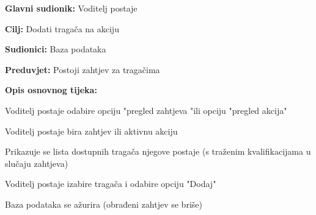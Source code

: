 					\noindent {}
					\begin{packed_item}
	
						\item \textbf{Glavni sudionik: }  Voditelj postaje
						\item  \textbf{Cilj:} Dodati tragača na akciju
						\item  \textbf{Sudionici:} Baza podataka
						\item  \textbf{Preduvjet:}  Postoji zahtjev za tragačima
						\item  \textbf{Opis osnovnog tijeka:} 
						
						
						\item[] \begin{packed_enum}
	
							\item Voditelj postaje odabire opciju "pregled zahtjeva "ili opciju "pregled akcija"
							\item Voditelj postaje bira zahtjev ili aktivnu akciju	
							\item Prikazuje se lista dostupnih tragača njegove postaje (s traženim kvalifikacijama u slučaju zahtjeva)
							\item Voditelj postaje izabire tragača i odabire opciju "Dodaj"
							\item Baza podataka se ažurira (obrađeni zahtjev se briše)
						\end{packed_enum}
					\end{packed_item}



